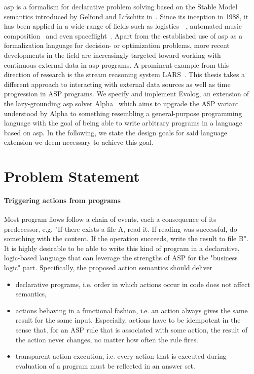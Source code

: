 \gls{asp} is a formalism for declarative problem solving based on the Stable Model semantics introduced by Gelfond and Lifschitz in~\cite{stable-models}. Since its inception in 1988, it has been applied in a wide range of fields such as logistics~\cite{gioia-tauro}~\cite{train-scheduling}, automated music composition~\cite{blues-composition} and even spaceflight~\cite{space-shuttle}. Apart from the established use of \gls{asp} as a formalization language for decision- or optimization problems, more recent developments in the field are increasingly targeted toward working with continuous external data in \gls{asp} programs. A prominent example from this direction of research is the stream reasoning system LARS~\cite{lars}. This thesis takes a different approach to interacting with external data sources as well as time progression in ASP programs. We specify and implement Evolog, an extension of the lazy-grounding \gls{asp} solver Alpha~\cite{alpha} which aims to upgrade the ASP variant understood by Alpha to something resembling a general-purpose programming language with the goal of being able to write arbitrary programs in a language based on \gls{asp}. In the following, we state the design goals for said language extension we deem necessary to achieve this goal.

\section{Problem Statement}

\paragraph{Triggering actions from programs} \label{goals:actions}Most program flows follow a chain of events, each a consequence of its predecessor, e.g. "If there exists a file A, read it. If reading was successful, do something with the content. If the operation succeeds, write the result to file B". It is highly desirable to be able to write this kind of program in a declarative, logic-based language that can leverage the strengths of ASP for the "business logic" part. Specifically, the proposed action semantics should deliver
\begin{itemize}
    \item declarative programs, i.e. order in which actions occur in code does not affect semantics,
    \item actions behaving in a functional fashion, i.e. an action always gives the same result for the same input. Especially, actions have to be idempotent in the sense that, for an ASP rule that is associated with some action, the result of the action never changes, no matter how often the rule fires.
    \item transparent action execution, i.e. every action that is executed during evaluation of a program must be reflected in an answer set.
\end{itemize}

